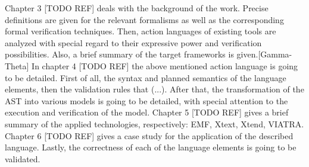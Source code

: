Chapter 3 [TODO REF] deals with the background of the work. Precise definitions are given for the relevant formalisms as well as the corresponding formal verification techniques. Then, action languages of existing tools are analyzed with special regard to their expressive power and verification possibilities. Also, a brief summary of the target frameworks is given.[Gamma-Theta]
In chapter 4 [TODO REF] the above mentioned action language is going to be detailed. First of all, the syntax and planned semantics of the language elements, then the validation rules that (...). After that, the transformation of the AST into various models is going to be detailed, with special attention to the execution and verification of the model.
Chapter 5 [TODO REF] gives a brief summary of the applied technologies, respectively: EMF, Xtext, Xtend, VIATRA.
Chapter 6 [TODO REF] gives a case study for the application of the described language. Lastly, the correctness of each of the language elements is going to be validated.